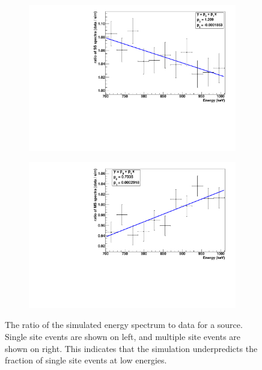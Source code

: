 \documentclass[herrin-thesis.tex]{subfiles}
\begin{document}
\begin{figure}[htbp]
\centering
	\begin{subfigure}[c]{0.48\textwidth}
	\centering
	\includegraphics[width=\textwidth]{./plots/analysis_shape_agreement_ratio_ss.pdf}
	\end{subfigure}\hfill%
	\begin{subfigure}[c]{0.48\textwidth}
	\centering
	\includegraphics[width=\textwidth]{./plots/analysis_shape_agreement_ratio_ms.pdf}
	\end{subfigure}
\caption[Ratio of simulated spectra to data as a function of energy]{The ratio of the simulated energy spectrum to data for a  source. Single site events are shown on left, and multiple site events are shown on right. This indicates that the simulation underpredicts the fraction of single site events at low energies.}
\label{fig:analysis_shape_agreement_ratio}
\end{figure}
\end{document}
